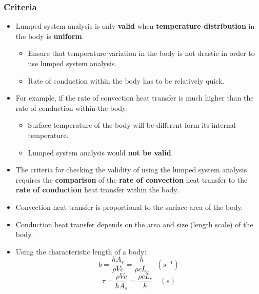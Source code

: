 \documentclass[11pt]{article}
\begin{document}
 \newpage
\subsubsection{Criteria}
\label{sec:org9437a5d}
\begin{itemize}
\item Lumped system analysis is only \textbf{valid} when \textbf{temperature distribution} in the body is \textbf{uniform}.
\begin{itemize}
\item Ensure that temperature variation in the body is not drastic in order to use lumped system analysis.
\item Rate of conduction within the body has to be relatively quick.
\end{itemize}
\item For example, if the rate of convection heat transfer is much higher than the rate of conduction within the body:
\begin{itemize}
\item Surface temperature of the body will be different form its internal temperature.
\item Lumped system analysis would \textbf{not be valid}.
\end{itemize}
\item The criteria for checking the validity of using the lumped system analysis requires the \textbf{comparison} of the \textbf{rate of convection} heat transfer to the \textbf{rate of conduction} heat transfer within the body.
\item Convection heat transfer is proportional to the surface area of the body.
\item Conduction heat transfer depends on the area and size (length scale) of the body.
\item Using the characteristic length of a body:
\[b = \frac{h A_s}{\rho V c} = \frac{h}{\rho c L_c} \quad (\unit{s^{-1}})\]
\[\tau = \frac{\rho V c}{h A_s} = \frac{\rho c L_c}{h} \quad (\unit{s})\]
\end{itemize}

 \newpage
\end{document}
